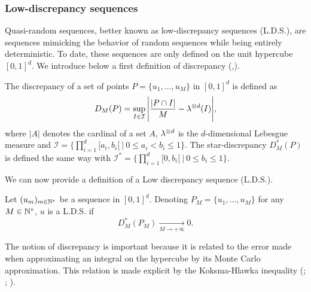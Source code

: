 \subsubsection{Low-discrepancy sequences} \label{sub:lds}

Quasi-random sequences, better known as low-discrepancy sequences (L.D.S.), are 
sequences mimicking the behavior of random sequences while being entirely 
deterministic. {To date, these sequences are only defined on the unit 
{hypercube}
$[0,1]^d$. We introduce below a first definition of discrepancy 
(\citep{lemieux2009monte},\citep{dick2010digital})}.
\begin{D}
The discrepancy of a set of points $P = \{u_1, \hdots, u_M\}$ in {$[0,1]^d$} is defined as
$$D_M(P) = \sup_{I\in \mathcal{I}} \Bigg| \frac{| P \cap I |}{M} - \lambda^{\otimes d}(I)\Bigg|,$$
where  $|A|$ denotes the cardinal of a set $A$, $\lambda^{\otimes d}$ is the $d$-dimensional Lebesgue measure and
 $\mathcal{I} = \{\prod\limits_{i = 1}^d [a_i,b_i[\ |\ 0 \leq a_i < b_i \leq 1\}$. The star-discrepancy $D_M^*(P)$ is defined the same way with $\mathcal{I}^{*} = \{\prod\limits_{i = 1}^d [0,b_i[ \ |\ 0 \leq  b_i \leq 1\}$.
\end{D}

We can now provide a definition of a Low discrepancy sequence (L.D.S.).
\begin{D}
{Let $(u_m)_{m\in\mathbb{N}^*}$ be a sequence in $[0,1]^d$. Denoting $P_M = \{u_1, \hdots, u_M\}$ for any $M\in\mathbb{N}^*$, $u$ is a L.D.S. if
$$D_M^*(P_M) \xrightarrow[M \to +\infty]{} 0.$$}
\end{D}




{The notion of discrepancy is important because it is related to the error made when approximating an integral on the hypercube by its Monte Carlo approximation.} {This relation is made explicit by the Koksma-Hlawka inequality (\citep{lemieux2009monte}; \citep{dick2010digital}; \citep{brandolini2013koksma}).}

